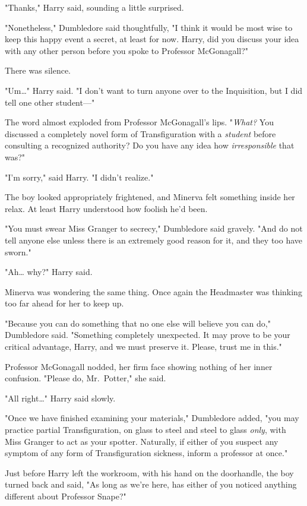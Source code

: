 "Thanks," Harry said, sounding a little surprised.

"Nonetheless," Dumbledore said thoughtfully, "I think it would be most wise to
keep this happy event a secret, at least for now. Harry, did you discuss your
idea with any other person before you spoke to Professor McGonagall?"

There was silence.

"Um{\ldots}" Harry said. "I don't want to turn anyone over to the Inquisition,
but I did tell one other student---"

The word almost exploded from Professor McGonagall's lips. "\emph{What?} You
discussed a completely novel form of Transfiguration with a \emph{student}
before consulting a recognized authority? Do you have any idea how
\emph{irresponsible} that was?"

"I'm sorry," said Harry. "I didn't realize."

The boy looked appropriately frightened, and Minerva felt something inside her
relax. At least Harry understood how foolish he'd been.

"You must swear Miss Granger to secrecy," Dumbledore said gravely. "And do not
tell anyone else unless there is an extremely good reason for it, and they too
have sworn."

"Ah{\ldots} why?" Harry said.

Minerva was wondering the same thing. Once again the Headmaster was thinking
too far ahead for her to keep up.

"Because you can do something that no one else will believe you can do,"
Dumbledore said. "Something completely unexpected. It may prove to be your
critical advantage, Harry, and we must preserve it. Please, trust me in this."

Professor McGonagall nodded, her firm face showing nothing of her inner
confusion. "Please do, Mr.~Potter," she said.

"All right{\ldots}" Harry said slowly.

"Once we have finished examining your materials," Dumbledore added, "you may
practice partial Transfiguration, on glass to steel and steel to glass
\emph{only}, with Miss Granger to act as your spotter. Naturally, if either of
you suspect any symptom of any form of Transfiguration sickness, inform a
professor at once."

Just before Harry left the workroom, with his hand on the doorhandle, the boy
turned back and said, "As long as we're here, has either of you noticed
anything different about Professor Snape?"

